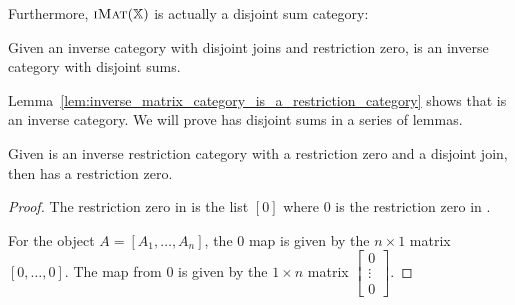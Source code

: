 Furthermore, $\textsc{iMat}({\mathbb{X}})$ is actually a disjoint sum category:
\begin{theorem}\label{thm:imatx_is_an_disjoint_sum_category}
  Given \X an inverse category with disjoint joins and restriction zero, \imatx is an inverse
  category with disjoint sums.
\end{theorem}

Lemma~\ref{lem:inverse_matrix_category_is_a_restriction_category} shows that \imatx is an inverse
category. We will prove \imatx has disjoint sums in a series of lemmas.

\begin{lemma}\label{lem:imat_has_restriction_zero}
  Given \X is an inverse restriction category with a restriction zero and a disjoint join,
  then \imatx has a restriction zero.
\end{lemma}
\begin{proof}
  The restriction zero in \imatx is the list $[0]$ where $0$ is the restriction zero in \X.

  For the object $A=[A_1,\ldots,A_n]$, the $0$ map is given by the $n\times 1$ matrix
  $[0,\ldots,0]$. The map from $0$ is given by the $1\times n$ matrix
  $\begin{bmatrix}0\\ \vdots\\ 0\end{bmatrix}$.

\end{proof}

